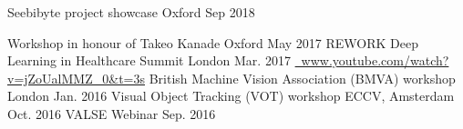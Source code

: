 \begin{cvtalks}
  \cvtalk
    {} %
    {Seebibyte project showcase} %
    {Oxford} %
    {Sep 2018} %

  \cvtalk
    {} %
    {Workshop in honour of Takeo Kanade} %
    {Oxford} %
    {May 2017} %
  \cvtalk
    {} %
    {REWORK Deep Learning in Healthcare Summit} %
    {London} %
    {Mar. 2017} %
  \cvtalkinfo
    {\href{http://www.youtube.com/watch?v=jZoUalMMZ_0\&t=3s}{\ www.youtube.com/watch?v=jZoUalMMZ\_0\&t=3s}}
    {} %
    {} %
  \cvtalk
    {} %
    {British Machine Vision Association (BMVA) workshop} %
    {London} %
    {Jan. 2016} %
  \cvtalk
    {} %
    {Visual Object Tracking (VOT) workshop} %
    {ECCV, Amsterdam} %
    {Oct. 2016} %
  \cvtalk
    {} %
    {VALSE Webinar} %
    {} %
    {Sep. 2016} %
\end{cvtalks}
